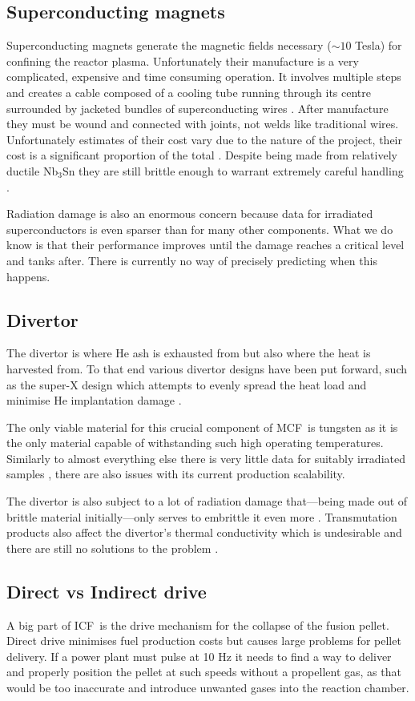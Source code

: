 \documentclass[12pt, a4paper]{article}
\newcommand{\mc}{MCF}
\newcommand{\ic}{ICF}
\begin{document}
		\subsection{Superconducting magnets}\label{ss:sm}
			Superconducting magnets generate the magnetic fields necessary ($\sim 10$ Tesla) for confining the reactor plasma. Unfortunately their manufacture is a very complicated, expensive and time consuming operation. It involves multiple steps and creates a cable composed of a cooling tube running through its centre surrounded by jacketed bundles of superconducting wires \cite{sm1}. After manufacture they must be wound and connected with joints, not welds like traditional wires. Unfortunately estimates of their cost vary due to the nature of the project, their cost is a significant proportion of the total \cite{scmcost}. Despite being made from relatively ductile Nb$_{3}$Sn they are still brittle enough to warrant extremely careful handling \cite{sm2}.
			
			Radiation damage is also an enormous concern because data for irradiated superconductors is even sparser than for many other components. What we do know is that their performance improves until the damage reaches a critical level and tanks after. There is currently no way of precisely predicting when this happens.
		\subsection{Divertor}\label{ss:div}
			The divertor is where He ash is exhausted from but also where the heat is harvested from. To that end various divertor designs have been put forward, such as the super-X \cite{superx} design which attempts to evenly spread the heat load and minimise He implantation damage \cite{hew}.
			
			The only viable material for this crucial component of \mc~is tungsten as it is the only material capable of withstanding such high operating temperatures. Similarly to almost everything else there is very little data for suitably irradiated samples \cite{irw2,irw3}, there are also issues with its current production scalability.
			
			The divertor is also subject to a lot of radiation damage that---being made out of brittle material initially---only serves to embrittle it even more \cite{irw1}. Transmutation products also affect the divertor's thermal conductivity which is undesirable and there are still no solutions to the problem \cite{divprod}.
		\subsection{Direct vs Indirect drive}\label{ss:drv}
			A big part of \ic~is the drive mechanism for the collapse of the fusion pellet. Direct drive minimises fuel production costs but causes large problems for pellet delivery. If a power plant must pulse at 10 Hz it needs to find a way to deliver and properly position the pellet at such speeds without a propellent gas, as that would be too inaccurate and introduce unwanted gases into the reaction chamber. 
			
\end{document}
